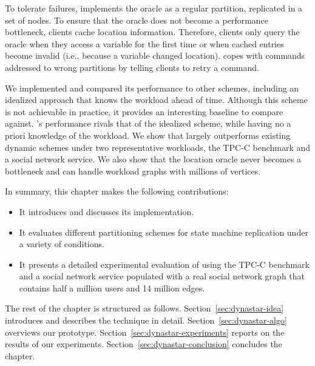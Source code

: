 To tolerate failures, \dynastar implements the oracle as a regular partition,
replicated in a set of nodes. To ensure that the oracle does not become a
performance bottleneck, clients cache location information. Therefore, clients
only query the oracle when they access a variable for the first time or when
cached entries become invalid (i.e., because a variable changed location).
\dynastar copes with commands addressed to wrong partitions by telling clients
to retry a command.

We implemented \dynastar and compared its performance to other schemes,
including an idealized approach that knows the workload ahead of time. Although
this scheme is not achievable in practice, it provides an interesting baseline
to compare against. \dynastar's performance rivals that of the idealized scheme,
while having no a priori knowledge of the workload. We show that \dynastar
largely outperforms existing dynamic schemes under two representative workloads,
the TPC-C benchmark and a social network service. We also show that the location
oracle never becomes a bottleneck and can handle workload graphs with millions
of vertices.

In summary, this chapter makes the following contributions:
\begin{itemize}
\item It introduces \dynastar and discusses its implementation.
\item It evaluates different partitioning schemes for state machine replication
under a variety of conditions.
\item It presents a detailed experimental evaluation of \dynastar using the
TPC-C benchmark and a social network service populated with a real social
network graph that contains half a million users and 14 million edges.
\end{itemize}


The rest of the chapter is structured as follows.
Section~\ref{sec:dynastar-idea} introduces \dynastar and describes the technique in detail.
Section~\ref{sec:dynastar-algo} overviews our prototype.
Section~\ref{sec:dynastar-experiments} reports on the results of our experiments.
Section~\ref{sec:dynastar-conclusion} concludes the chapter.


